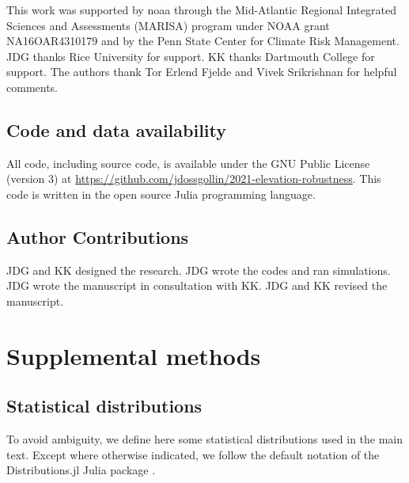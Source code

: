 \documentclass[11pt]{article}
\begin{document}
This work was supported by \acrfull{noaa} through the Mid-Atlantic Regional Integrated Sciences and Assessments (MARISA) program under NOAA grant NA16OAR4310179 and by the Penn State Center for Climate Risk Management.
JDG thanks Rice University for support.
KK thanks Dartmouth College for support.
The authors thank Tor Erlend Fjelde and Vivek Srikrishnan for helpful comments.

\subsection*{Code and data availability}

All code, including source code, is available under the GNU Public License (version 3) at \url{https://github.com/jdossgollin/2021-elevation-robustness}.
This code is written in the open source Julia programming language.

\subsection*{Author Contributions}

JDG and KK designed the research.
JDG wrote the codes and ran simulations.
JDG wrote the manuscript in consultation with KK.
JDG and KK revised the manuscript.

\printbibliography

\appendix
\newcommand{\hbAppendixPrefix}{S}
\renewcommand{\thefigure}{\hbAppendixPrefix\arabic{figure}}
\setcounter{figure}{0}
\renewcommand{\thetable}{\hbAppendixPrefix\arabic{table}}
\setcounter{table}{0}
\renewcommand{\theequation}{\hbAppendixPrefix\arabic{equation}}
\setcounter{equation}{0}

\newpage

\printglossary[type=\acronymtype,title=List of Abbreviations]

\section{Supplemental methods}

\subsection{Statistical distributions}

To avoid ambiguity, we define here some statistical distributions used in the main text.
Except where otherwise indicated, we follow the default notation of the Distributions.jl Julia package \citep{besancon_distributions.jl:2021}.
\end{document}
